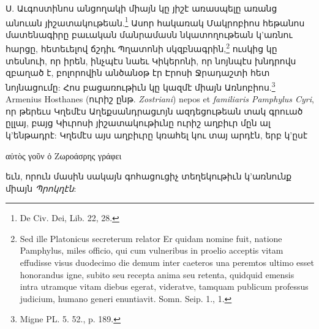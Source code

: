 \documentclass{article}
\begin{document}
{Ս. Աւգոստինոս անցողակի միայն կը յիշէ առասպելը առանց անուան յիշատակութեան.\footnote{De Civ. Dei, Lib. 22, 28.} Ասոր հակառակ Մակրոբիոս հեթանոս մատենագիրը բաւական մանրամասն նկատողութեան կ'առնու հարցը, հետեւելով ճշդիւ Պղատոնի սկզբնագրին,\footnote{Sed ille Platonicus secreterum relator Er quidam nomine fuit, natione Pamphylus, miles officio, qui cum vulneribus in proelio acceptis vitam effudisse visus duodecimo die demum inter caeteros una peremtos ultimo esset honorandus igne, subito seu recepta anima seu retenta, quidquid emensis intra utramque vitam diebus egerat, videratve, tamquam publicum professus judicium, humano generi enuntiavit. Somn. Seip. 1., 1.} ուսկից կը տեսնուի, որ իրեն, ինչպէս նաեւ Կիկերոնի, որ նոյնպէս խնդրովս զբաղած է, բոլորովին անծանօթ էր Էրոսի Ջրադաշտի հետ նոյնացումը: Հոս բացառութիւն կը կազմէ միայն Առնոբիոս.\footnote{Migne PL. 5. 52., p. 189.} Armenius Hosthanes (ուրիշ ընթ. \emph{Zostriani}) nepos et \emph{familiaris Pamphylus Cyri}, որ թերեւս Կղեմէս Աղեքսանդրացւոյն ազդեցութեան տակ գրուած ըլլայ, բայց Կիւրոսի յիշատակութիւնը ուրիշ աղբիւր մըն ալ կ'ենթադրէ: Կղեմէս այս աղբիւրը կռահել կու տայ արդէն, երբ կ'ըսէ \begin{greek}αὐτὸς γοῦν ὁ Ζωροάσρης γράφει\end{greek} եւն, որուն մասին սակայն գոհացուցիչ տեղեկութիւն կ'առնունք միայն \emph{Պրոկղէն}:

}
\end{document}
